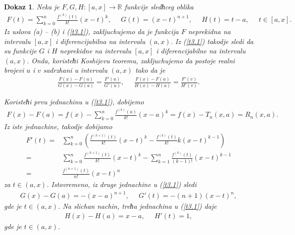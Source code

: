 \documentclass[12pt,a4paper]{article}
\newtheorem*{dokaz}{Dokaz}
\begin{document}
 \begin{dokaz}
 Neka je $F,G,H:[a,x]\rightarrow\mathbb{R}$ funkcije sledћceg
 oblika 
 \begin{align}\label{t3.1}
     F(t)
     =
     \sum_{k=0}^{n}\frac{f^{(k)}(t)}{k!}(x-t)^{k}, 
     \;\;\;\;\; 
     G(t)=(x-t)^{n+1}, 
     \;\;\;\;\; 
     H(t)=t-a, 
     \;\;\;\;\; t\in[a,x]. 
 \end{align}
 Iz uslova (a) -- (b) i (\ref{t3.1}), zakljuchujemo da je 
 funkcija $F$ neprekidna na intervalu $[a,x]$ 
 i diferencijabilna na intervalu $(a,x)$. 
 Iz (\ref{t3.1}) takodje sledi da su funkcije $G$ i $H$ 
 neprekidne na intervalu $[a,x]$ 
 i diferencijabilne na intervalu $(a,x)$. 
 Onda, koristeћi Koshijevu teoremu, 
 zakljuchujemo da postoje realni brojevi $u$ i $v$ 
 sadrzhani u intervalu $(a,x)$ tako da je 
 \begin{align}\label{t3.3}
     \frac{F(x)-F(a)}{G(x)-G(a)}
     =
     \frac{F'(u)}{G'(u)}, 
     \;\;\;\;\; 
     \frac{F(x)-F(a)}{H(x)-H(a)}
     =
     \frac{F'(v)}{H'(v)}. 
 \end{align}
 
 Koristeћi prvu jednachinu u (\ref{t3.1}), dobijemo 
 \begin{align}\label{t3.5}
    F(x)-F(a)
    =
    f(x)-\sum_{k=0}^{n}\frac{f^{(k)}(a)}{k!}(x-a)^{k}
    =
    f(x)-T_{n}(x,a)
    =
    R_{n}(x,a).  
 \end{align}
 Iz iste jednachine, takodje dobijamo 
 \begin{align}\label{t3.7}
    F'(t)
    =&
    \sum_{k=0}^{n}
    \left(
    \frac{f^{(k+1)}(t)}{k!}(x-t)^{k}
    -
     \frac{f^{(k)}(t)}{k!}k(x-t)^{k-1}
    \right)
    \nonumber\\
    =&
    \sum_{k=0}^{n}
    \frac{f^{(k+1)}(t)}{k!}(x-t)^{k}
    -
    \sum_{k=1}^{n}
     \frac{f^{(k)}(t)}{(k-1)!}(x-t)^{k-1}
     \nonumber\\
     =&
     \frac{f^{(n+1)}(t)}{n!}(x-t)^{n}
 \end{align}
 za $t\in(a,x)$. 
 Istovremeno, iz druge jednachine 
 u (\ref{t3.1}) sledi  
 \begin{align}\label{t3.9}
    G(x)-G(a)=-(x-a)^{n+1}, 
    \;\;\;\;\; 
    G'(t)=-(n+1)(x-t)^{n},  
 \end{align}
 gde je $t\in(a,x)$. 
 Na slichan nachin, treћa jednachina u (\ref{t3.1}) daje 
 \begin{align}\label{t3.11}
     H(x)-H(a)=x-a, 
     \;\;\;\;\; 
     H'(t)=1, 
 \end{align}
 gde je $t\in(a,x)$. 
 

\end{dokaz}
\end{document}
